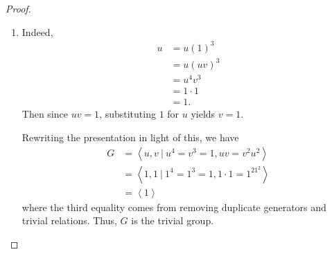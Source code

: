 \documentclass[12pt]{article}
\theoremstyle{definition}
\begin{document}
\begin{proof}
\begin{enumerate}[label=(\alph*)]
\begin{align*}
			      uv & = v^2u^2   \\
			         & = u^2v^2   \\
			         & = u(uv)v   \\
			         & = (uv)(uv) \\
			         & = (uv)^2.
		      \end{align*}
		      Multiplying by $(uv)^{-1}$ on both sides yields $1 = uv$.
		\item Indeed, \begin{align*}
			      u & = u(1)^3    \\
			        & = u(uv)^3   \\
			        & = u^4v^3    \\
			        & = 1 \cdot 1 \\
			        & = 1.
		      \end{align*}
		      Then since $uv = 1$, substituting $1$ for $u$ yields $v = 1$.

		      Rewriting the presentation in light of this, we have \begin{align*}
			      G & = \left\langle u, v\ |\ u^4 = v^3 = 1, uv = v^2u^2 \right\rangle        \\
			        & = \left\langle 1, 1\ |\ 1^4 = 1^3 = 1, 1 \cdot 1 = 1^21^2 \right\rangle \\
			        & = \left\langle 1 \right\rangle
		      \end{align*}
		      where the third equality comes from removing duplicate generators and trivial relations.
		      Thus, $G$ is the trivial group.
	\end{enumerate}
\end{proof}
\end{document}
